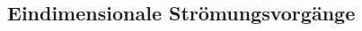 \documentclass[twocolumn]{article}
\begin{document}
\begin{multicols}{2}
%                                                                             

\section{Eindimensionale Strömungsvorgänge}


\end{multicols}
\end{document}
